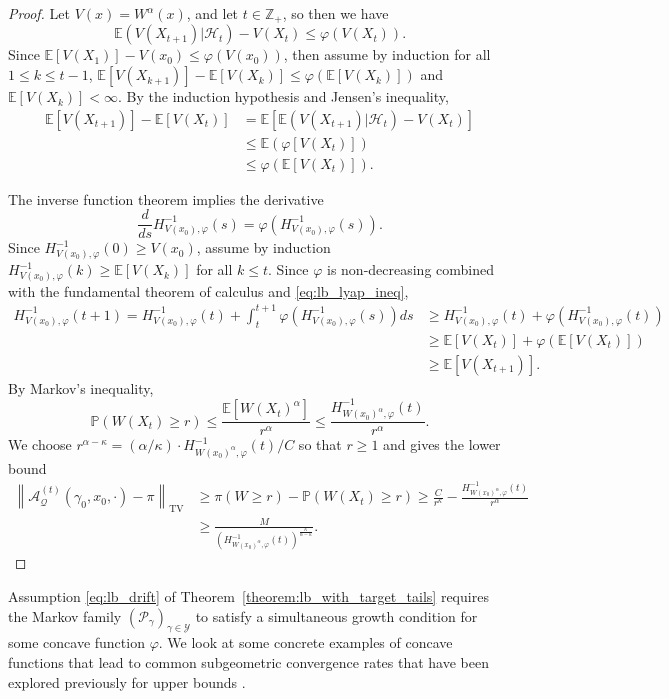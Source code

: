 \documentclass[12pt]{article}
\theoremstyle{plain}
\theoremstyle{remark}
\newcommand{\norm}[1]{\left\lVert#1\right\rVert}
\newcommand{\Z}{\mathbb{Z}}
\newcommand{\Q}{\mathcal{Q}}
\newcommand{\E}{\mathbb{E}}
\newcommand{\Prob}{\mathbb{P}}
\renewcommand{\P}{\mathcal{P}}
\newcommand{\A}{\mathcal{A}}
\renewcommand{\H}{\mathcal{H}}
\newcommand{\Y}{\mathcal{Y}}
\let\temp\phi
\let\phi\varphi
\let\varphi\temp
\newcommand{\eq}[1]{\begin{align*}#1\end{align*}}
\begin{document}
\begin{proof}
Let $V(x) = W^\alpha(x)$, and let $t \in \Z_+$, so then we have
\[
\E\left( V(X_{t + 1}) | \H_t \right) - V(X_{t})
\le \phi(V(X_{t})).
\]
Since $\E\left[ V(X_{1}) \right] - V(x_0) \le \phi( V(x_0) )$, then assume by induction for all $1 \le k \le t-1$,
$
\E\left[ V(X_{k + 1}) \right] - \E[ V(X_{k}) ] \le \phi(\E[ V(X_{k}) ] )
$
and $\E[ V(X_{k}) ] < \infty$.
By the induction hypothesis and Jensen's inequality,
\begin{align}
\E\left[ V(X_{t + 1}) \right] - \E\left[ V(X_{t}) \right]
&= \E\left[ 
\E\left( V(X_{t + 1}) | \H_t \right) - V(X_{t})
\right]
\nonumber
\\
&\le \E\left(
\phi[ V(X_{t}) ]
\right)
\nonumber
\\
&\le
\phi( \E\left[ V(X_{t} ) \right] ).
\label{eq:lb_lyap_ineq}
\end{align}

The inverse function theorem implies the derivative 
\[
\frac{d}{ds} H^{-1}_{V(x_0), \phi}(s) = \phi(H^{-1}_{V(x_0), \phi}(s)).
\]
Since $H^{-1}_{V(x_0), \phi}(0) \ge V(x_0)$, assume by induction $H^{-1}_{V(x_0), \phi}(k) \ge \E[ V(X_{k}) ]$ for all $k \le t$.
Since $\phi$ is non-decreasing combined with the fundamental theorem of calculus and \eqref{eq:lb_lyap_ineq},
\begin{align*}
H^{-1}_{V(x_0), \phi}( t + 1 )
= H^{-1}_{V(x_0), \phi}( t ) + \int_{t}^{t + 1}  \phi( H^{-1}_{V(x_0), \phi}( s ) ) ds
&\ge H^{-1}_{V(x_0), \phi}( t ) + \phi( H^{-1}_{V(x_0), \phi}( t ) )
\\
&\ge \E\left[ V(X_{t}) \right] + \phi( \E\left[ V(X_{t}) \right] )
\\
&\ge \E\left[ V(X_{t + 1}) \right].
\end{align*}
By Markov's inequality,
\[
\Prob( W(X_t) \ge r)
\le \frac{ \E\left[ W(X_t)^\alpha \right] }{ r^{\alpha} }
\le \frac{ H_{W(x_0)^\alpha, \phi}^{-1}(t) }{ r^{\alpha} }.
\]
We choose $r^{\alpha - \kappa} = (\alpha / \kappa) \cdot H_{W(x_0)^\alpha, \phi}^{-1}(t) / C$ so that $r \ge 1$ and gives the lower bound
\eq{
\norm{ \A_{\Q}^{(t)}(\gamma_0, x_0, \cdot) - \pi }_{\text{TV}}
&\ge \pi(W \ge r) - \Prob(W(X_t) \ge r)
\ge \frac{C}{r^\kappa} - \frac{ H_{W(x_0)^\alpha, \phi}^{-1}(t) }{ r^{\alpha} }
\\
&\ge \frac{M}{ \left( H_{W(x_0)^\alpha, \phi}^{-1}(t) \right)^{\frac{\kappa}{\alpha - \kappa} } }.
}
\end{proof}

Assumption \eqref{eq:lb_drift} of Theorem~\ref{theorem:lb_with_target_tails} requires the Markov family $(\P_\gamma)_{\gamma \in \Y}$ to satisfy a simultaneous growth condition for some concave function $\phi$.
We look at some concrete examples of concave functions that lead to common subgeometric convergence rates that have been explored previously for upper bounds \citep{douc:etal:2004}.
\end{document}
